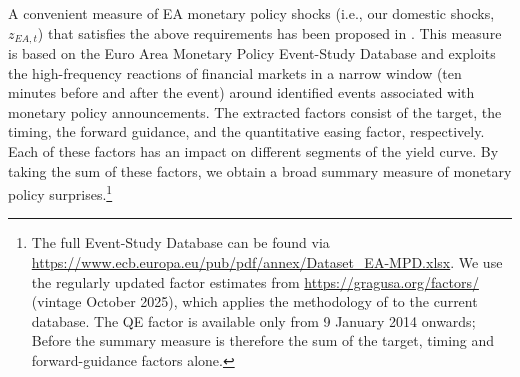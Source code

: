 A convenient measure of EA monetary policy shocks (i.e., our domestic shocks, $z_{EA,t}$) that satisfies the above requirements has been proposed in \cite{altavilla2019measuring}. This measure is based on the Euro Area Monetary Policy Event-Study Database and exploits the high-frequency reactions of financial markets in a narrow window (ten minutes before and after the event) around identified events associated with monetary policy announcements. The extracted factors consist of the target, the timing, the forward guidance, and the quantitative easing factor, respectively. Each of these factors has an impact on different segments of the yield curve. %
By taking the sum of these factors, we obtain a broad summary measure of monetary policy surprises.\footnote{The full Event-Study Database can be found via \href{https://www.ecb.europa.eu/pub/pdf/annex/Dataset_EA-MPD.xlsx}{https://www.ecb.europa.eu/pub/pdf/annex/Dataset\_EA-MPD.xlsx}. We use the regularly updated factor estimates from \href{https://gragusa.org/factors/}{https://gragusa.org/factors/} (vintage October 2025), which applies the methodology of \cite{altavilla2019measuring} to the current database. The QE factor is available only from 9 January 2014 onwards; Before the summary measure is therefore the sum of the target, timing and forward-guidance factors alone.} 


